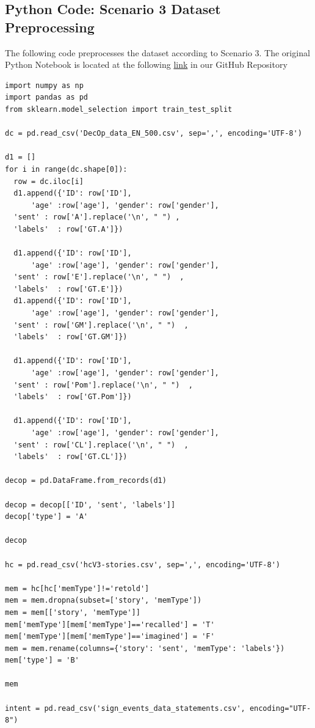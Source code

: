 \documentclass[10pt,twocolumn,letterpaper]{article}
\begin{document}
\subsection{Python Code: Scenario 3 Dataset Preprocessing}

The following code preprocesses the dataset according to Scenario 3.
The original Python Notebook is located at the following \href{https://colab.research.google.com/github/TannerAGraves/GPT-LieDetection/blob/main/dataset/datasets.ipynb}{link} in our GitHub Repository

\begin{verbatim}
import numpy as np
import pandas as pd
from sklearn.model_selection import train_test_split

dc = pd.read_csv('DecOp_data_EN_500.csv', sep=',', encoding='UTF-8')

d1 = []
for i in range(dc.shape[0]):
  row = dc.iloc[i]
  d1.append({'ID': row['ID'],
      'age' :row['age'], 'gender': row['gender'],
  'sent' : row['A'].replace('\n', " ") ,
  'labels'  : row['GT.A']})

  d1.append({'ID': row['ID'],
      'age' :row['age'], 'gender': row['gender'],
  'sent' : row['E'].replace('\n', " ")  ,
  'labels'  : row['GT.E']})
  d1.append({'ID': row['ID'],
      'age' :row['age'], 'gender': row['gender'],
  'sent' : row['GM'].replace('\n', " ")  ,
  'labels'  : row['GT.GM']})

  d1.append({'ID': row['ID'],
      'age' :row['age'], 'gender': row['gender'],
  'sent' : row['Pom'].replace('\n', " ")  ,
  'labels'  : row['GT.Pom']})

  d1.append({'ID': row['ID'],
      'age' :row['age'], 'gender': row['gender'],
  'sent' : row['CL'].replace('\n', " ")  ,
  'labels'  : row['GT.CL']})

decop = pd.DataFrame.from_records(d1)

decop = decop[['ID', 'sent', 'labels']]
decop['type'] = 'A'

decop

hc = pd.read_csv('hcV3-stories.csv', sep=',', encoding='UTF-8')

mem = hc[hc['memType']!='retold']
mem = mem.dropna(subset=['story', 'memType'])
mem = mem[['story', 'memType']]
mem['memType'][mem['memType']=='recalled'] = 'T'
mem['memType'][mem['memType']=='imagined'] = 'F'
mem = mem.rename(columns={'story': 'sent', 'memType': 'labels'})
mem['type'] = 'B'

mem

intent = pd.read_csv('sign_events_data_statements.csv', encoding="UTF-8")


\end{verbatim}
\end{document}
